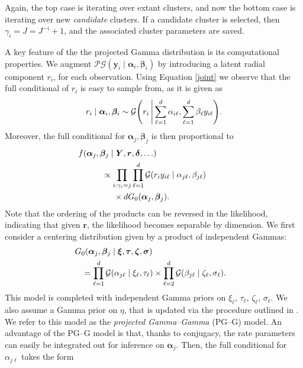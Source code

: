 Again, the top case is iterating over extant clusters, and now the bottom case is iterating 
    over new \emph{candidate} clusters.  If a candidate cluster is selected,
    then $\gamma_i = J = J^{- i} + 1$, and the associated cluster parameters are saved.

A key feature of the the projected Gamma distribution is its computational properties. We augment 
$\mathcal{PG}(\bm{y}_i\mid\bm{\alpha}_i,\bm{\beta}_i) $ by introducing a latent radial component $r_i$, 
for each observation. Using Equation \eqref{joint} we observe that the 
full conditional of $r_i$ is easy to sample from, as it is given as
\begin{equation}
    r_i\mid\bm{\alpha}_i,\bm{\beta}_i \sim \mathcal{G}\left(r_i \bigmid \sum_{\ell = 1}^d\alpha_{i\ell}, \sum_{\ell = 1}^d\beta_{\ell} y_{i\ell}\right).
\end{equation}
Moreover,  the full conditional for $\bm{\alpha}_j,\bm{\beta}_j$ is then proportional to
\begin{equation}
    \begin{aligned}
    &\hspace{-1cm}f(\bm{\alpha}_j,\bm{\beta}_j\mid \bm{Y},\bm{r},\bm{\delta},\ldots) \\
    &\propto \prod_{i:\gamma_i = j}\prod_{\ell = 1}^d\mathcal{G}\left(r_iy_{i\ell}\mid\alpha_{j\ell},\beta_{j\ell}\right) \\
    &\hspace{0.5cm} \times dG_0(\bm{\alpha}_j,\bm{\beta}_j).
    \end{aligned}
\end{equation}
Note that the ordering of the products can be reversed in the likelihood, indicating that given $\bm{r}$, 
the likelihood becomes separable by dimension.
We first consider a centering distribution given by a product of independent Gammas:
\begin{equation}
    \begin{aligned}
    &\hspace{-0.3cm}G_0(\bm{\alpha}_j,\bm{\beta}_j\mid \bm{\xi},\bm{\tau},\bm{\zeta},\bm{\sigma}) \\
    &= \prod_{\ell = 1}^d\mathcal{G}(\alpha_{j\ell}\mid \xi_{\ell},\tau_{\ell})\times\prod_{\ell = 2}^d\mathcal{G}(\beta_{j\ell}\mid\zeta_{\ell},\sigma_{\ell}).
    \end{aligned}
\end{equation}
This model is completed with independent Gamma priors on $\xi_{\ell}$, $\tau_{\ell}$, $\zeta_{\ell}$, $\sigma_{\ell}$.  We also assume a Gamma prior on $\eta$, that is updated via the procedure outlined in \cite{escobar1995}.  We refer to this model as the \emph{projected Gamma--Gamma} (PG--G) model.  An advantage of the PG--G model is that, thanks to conjugacy, the rate parameters can easily be integrated out for inference on $\bm{\alpha}_j$.  Then, the full conditional for $\alpha_{j\ell}$ takes the form
